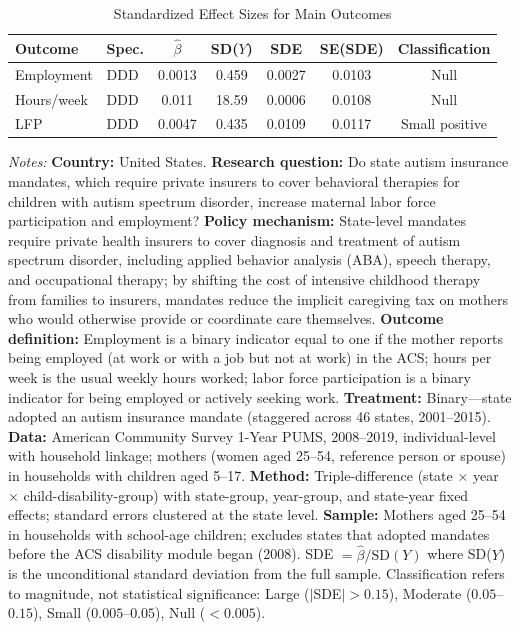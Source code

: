 \begin{table}[H]
\centering
\caption{Standardized Effect Sizes for Main Outcomes}
\label{tab:sde}
\small
\begin{tabular}{llccccc}
\toprule
Outcome & Spec. & $\hat{\beta}$ & SD($Y$) & SDE & SE(SDE) & Classification \\
\midrule
Employment & DDD & 0.0013 & 0.459 & 0.0027 & 0.0103 & Null \\
Hours/week & DDD & 0.011 & 18.59 & 0.0006 & 0.0108 & Null \\
LFP & DDD & 0.0047 & 0.435 & 0.0109 & 0.0117 & Small positive \\
\bottomrule
\end{tabular}
\par\vspace{0.3em}
\parbox{\textwidth}{\scriptsize
\textit{Notes:} \textbf{Country:} United States. \textbf{Research question:} Do state autism insurance mandates, which require private insurers to cover behavioral therapies for children with autism spectrum disorder, increase maternal labor force participation and employment? \textbf{Policy mechanism:} State-level mandates require private health insurers to cover diagnosis and treatment of autism spectrum disorder, including applied behavior analysis (ABA), speech therapy, and occupational therapy; by shifting the cost of intensive childhood therapy from families to insurers, mandates reduce the implicit caregiving tax on mothers who would otherwise provide or coordinate care themselves. \textbf{Outcome definition:} Employment is a binary indicator equal to one if the mother reports being employed (at work or with a job but not at work) in the ACS; hours per week is the usual weekly hours worked; labor force participation is a binary indicator for being employed or actively seeking work. \textbf{Treatment:} Binary---state adopted an autism insurance mandate (staggered across 46 states, 2001--2015). \textbf{Data:} American Community Survey 1-Year PUMS, 2008--2019, individual-level with household linkage; mothers (women aged 25--54, reference person or spouse) in households with children aged 5--17. \textbf{Method:} Triple-difference (state $\times$ year $\times$ child-disability-group) with state-group, year-group, and state-year fixed effects; standard errors clustered at the state level. \textbf{Sample:} Mothers aged 25--54 in households with school-age children; excludes states that adopted mandates before the ACS disability module began (2008). SDE $= \hat{\beta} / \text{SD}(Y)$ where SD($Y$) is the unconditional standard deviation from the full sample. Classification refers to magnitude, not statistical significance: Large ($|$SDE$| > 0.15$), Moderate ($0.05$--$0.15$), Small ($0.005$--$0.05$), Null ($< 0.005$).}
\end{table}
